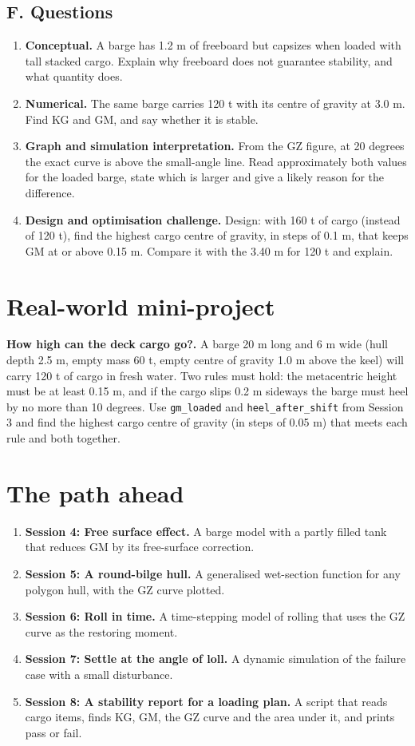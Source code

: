 \documentclass[11pt,a4paper]{article}
\begin{document}
\subsection*{F. Questions}
\begin{enumerate}[nosep]
\item \textbf{Conceptual.} A barge has 1.2 m of freeboard but capsizes when loaded with tall stacked cargo. Explain why freeboard does not guarantee stability, and what quantity does.
\item \textbf{Numerical.} The same barge carries 120 t with its centre of gravity at 3.0 m. Find KG and GM, and say whether it is stable.
\item \textbf{Graph and simulation interpretation.} From the GZ figure, at 20 degrees the exact curve is above the small-angle line. Read approximately both values for the loaded barge, state which is larger and give a likely reason for the difference.
\item \textbf{Design and optimisation challenge.} Design: with 160 t of cargo (instead of 120 t), find the highest cargo centre of gravity, in steps of 0.1 m, that keeps GM at or above 0.15 m. Compare it with the 3.40 m for 120 t and explain.
\end{enumerate}

\section{Real-world mini-project}
\textbf{How high can the deck cargo go?.} A barge 20 m long and 6 m wide (hull depth 2.5 m, empty mass 60 t, empty centre of gravity 1.0 m above the keel) will carry 120 t of cargo in fresh water. Two rules must hold: the metacentric height must be at least 0.15 m, and if the cargo slips 0.2 m sideways the barge must heel by no more than 10 degrees. Use \texttt{gm\_loaded} and \texttt{heel\_after\_shift} from Session 3 and find the highest cargo centre of gravity (in steps of 0.05 m) that meets each rule and both together.

\section{The path ahead}
\begin{enumerate}[nosep]
\item \textbf{Session 4: Free surface effect.} A barge model with a partly filled tank that reduces GM by its free-surface correction.
\item \textbf{Session 5: A round-bilge hull.} A generalised wet-section function for any polygon hull, with the GZ curve plotted.
\item \textbf{Session 6: Roll in time.} A time-stepping model of rolling that uses the GZ curve as the restoring moment.
\item \textbf{Session 7: Settle at the angle of loll.} A dynamic simulation of the failure case with a small disturbance.
\item \textbf{Session 8: A stability report for a loading plan.} A script that reads cargo items, finds KG, GM, the GZ curve and the area under it, and prints pass or fail.
\end{enumerate}
\end{document}
